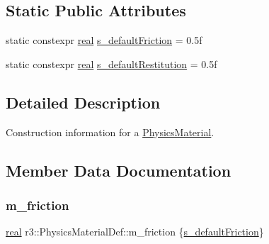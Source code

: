 \subsection*{Static Public Attributes}
\begin{DoxyCompactItemize}
\item 
static constexpr \mbox{\hyperlink{namespacer3_ab2016b3e3f743fb735afce242f0dc1eb}{real}} \mbox{\hyperlink{structr3_1_1_physics_material_def_a491a5e29b693bd20a7a8708f13c7f473}{s\+\_\+default\+Friction}} = 0.\+5f
\item 
static constexpr \mbox{\hyperlink{namespacer3_ab2016b3e3f743fb735afce242f0dc1eb}{real}} \mbox{\hyperlink{structr3_1_1_physics_material_def_a994308068cb88f266dd5f9f63f320add}{s\+\_\+default\+Restitution}} = 0.\+5f
\end{DoxyCompactItemize}


\subsection{Detailed Description}
Construction information for a \mbox{\hyperlink{classr3_1_1_physics_material}{Physics\+Material}}. 

\subsection{Member Data Documentation}
\mbox{\label{structr3_1_1_physics_material_def_aef82d9585791c1470ab92c6efa57b1b9}} 
\subsubsection{\texorpdfstring{m\+\_\+friction}{m\_friction}}
{\footnotesize\ttfamily \mbox{\hyperlink{namespacer3_ab2016b3e3f743fb735afce242f0dc1eb}{real}} r3\+::\+Physics\+Material\+Def\+::m\+\_\+friction \{\mbox{\hyperlink{structr3_1_1_physics_material_def_a491a5e29b693bd20a7a8708f13c7f473}{s\+\_\+default\+Friction}}\}}

\mbox{\label{structr3_1_1_physics_material_def_abf6dd41075d432324d9524e18f041a87}} 
